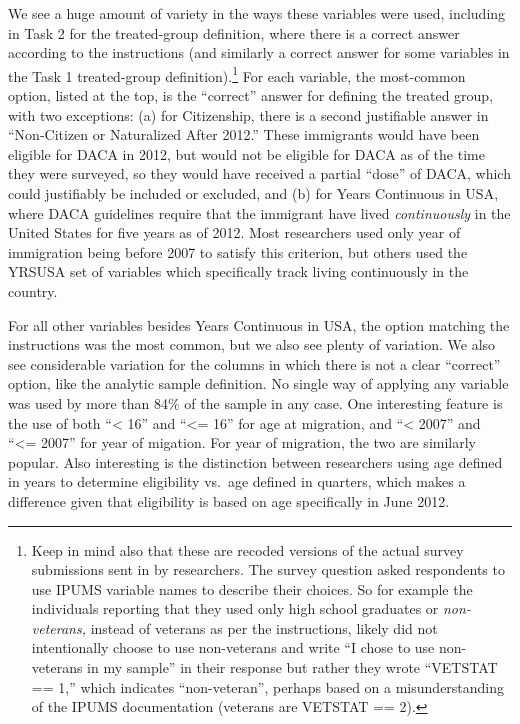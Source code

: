 \documentclass[
  letterpaper,
  DIV=11,
  numbers=noendperiod]{scrartcl}
\begin{document}
We see a huge amount of variety in the ways these variables were used,
including in Task 2 for the treated-group definition, where there is a
correct answer according to the instructions (and similarly a correct
answer for some variables in the Task 1 treated-group
definition).\footnote{Keep in mind also that these are recoded versions
  of the actual survey submissions sent in by researchers. The survey
  question asked respondents to use IPUMS variable names to describe
  their choices. So for example the individuals reporting that they used
  only high school graduates or \emph{non-veterans,} instead of veterans
  as per the instructions, likely did not intentionally choose to use
  non-veterans and write ``I chose to use non-veterans in my sample'' in
  their response but rather they wrote ``VETSTAT == 1,'' which indicates
  ``non-veteran'', perhaps based on a misunderstanding of the IPUMS
  documentation (veterans are VETSTAT == 2).} For each variable, the
most-common option, listed at the top, is the ``correct'' answer for
defining the treated group, with two exceptions: (a) for Citizenship,
there is a second justifiable answer in ``Non-Citizen or Naturalized
After 2012.'' These immigrants would have been eligible for DACA in
2012, but would not be eligible for DACA as of the time they were
surveyed, so they would have received a partial ``dose'' of DACA, which
could justifiably be included or excluded, and (b) for Years Continuous
in USA, where DACA guidelines require that the immigrant have lived
\emph{continuously} in the United States for five years as of 2012. Most
researchers used only year of immigration being before 2007 to satisfy
this criterion, but others used the YRSUSA set of variables which
specifically track living continuously in the country.

For all other variables besides Years Continuous in USA, the option
matching the instructions was the most common, but we also see plenty of
variation. We also see considerable variation for the columns in which
there is not a clear ``correct'' option, like the analytic sample
definition. No single way of applying any variable was used by more than
84\% of the sample in any case. One interesting feature is the use of
both ``\textless{} 16'' and ``\textless= 16'' for age at migration, and
``\textless{} 2007'' and ``\textless= 2007'' for year of migation. For
year of migration, the two are similarly popular. Also interesting is
the distinction between researchers using age defined in years to
determine eligibility vs.~age defined in quarters, which makes a
difference given that eligibility is based on age specifically in June
2012.
\end{document}

